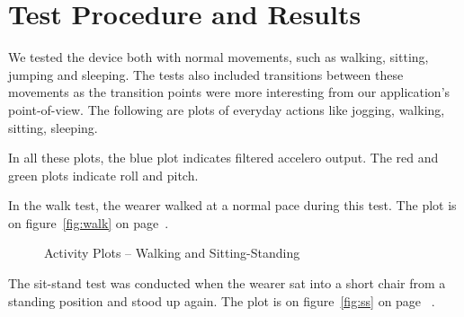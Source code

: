 \documentclass[11pt, a4paper]{article}
\begin{document}
\section{Test Procedure and Results}
We tested the device both with normal movements, such as walking, sitting,
jumping and sleeping. The tests also included transitions between these
movements as the transition points were more interesting from our
application's point-of-view. The following are plots of everyday actions
like jogging, walking, sitting, sleeping.

\noindent In all these plots, the blue plot indicates filtered accelero
output.  The red and green plots indicate roll and pitch.

\noindent In the walk test, the wearer walked at a normal pace during this
test. The plot is on figure~\ref{fig:walk} on page~\pageref{fig:walk}.

\begin{figure}[!ht]
   \caption{Activity Plots -- Walking and Sitting-Standing}
\end{figure}

\noindent The sit-stand test was conducted when the wearer sat into a short chair from a
standing position and stood up again. The plot is on figure~\ref{fig:ss} on page
~\pageref{fig:ss}.
\end{document}
